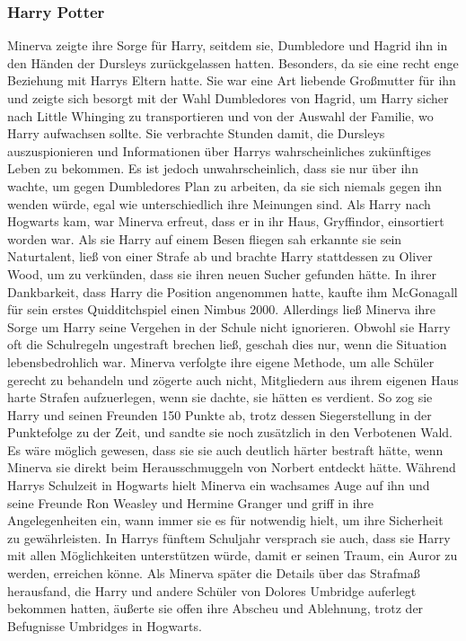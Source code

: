 \documentclass[a4paper, 10pt]{article}
\begin{document}
\subsubsection*{\large Harry Potter}
Minerva zeigte ihre Sorge für Harry, seitdem sie, Dumbledore und Hagrid ihn in den Händen der Dursleys zurückgelassen hatten. Besonders, da sie eine recht enge Beziehung mit Harrys Eltern hatte. Sie war eine Art liebende Großmutter für ihn und zeigte sich besorgt mit der Wahl Dumbledores von Hagrid, um Harry sicher nach Little Whinging zu transportieren und von der Auswahl der Familie, wo Harry aufwachsen sollte. Sie verbrachte Stunden damit, die Dursleys auszuspionieren und Informationen über Harrys wahrscheinliches zukünftiges Leben zu bekommen. Es ist jedoch unwahrscheinlich, dass sie nur über ihn wachte, um gegen Dumbledores Plan zu arbeiten, da sie sich niemals gegen ihn wenden würde, egal wie unterschiedlich ihre Meinungen sind.
\vspace{10pt}
\newline
Als Harry nach Hogwarts kam, war Minerva erfreut, dass er in ihr Haus, Gryffindor, einsortiert worden war. Als sie Harry auf einem Besen fliegen sah erkannte sie sein Naturtalent, ließ von einer Strafe ab und brachte Harry stattdessen zu Oliver Wood, um zu verkünden, dass sie ihren neuen Sucher gefunden hätte. In ihrer Dankbarkeit, dass Harry die Position angenommen hatte, kaufte ihm McGonagall für sein erstes Quidditchspiel einen Nimbus 2000.
\vspace{10pt}
\newline
Allerdings ließ Minerva ihre Sorge um Harry seine Vergehen in der Schule nicht ignorieren. Obwohl sie Harry oft die Schulregeln ungestraft brechen ließ, geschah dies nur, wenn die Situation lebensbedrohlich war. Minerva verfolgte ihre eigene Methode, um alle Schüler gerecht zu behandeln und zögerte auch nicht, Mitgliedern aus ihrem eigenen Haus harte Strafen aufzuerlegen, wenn sie dachte, sie hätten es verdient. So zog sie Harry und seinen Freunden 150 Punkte ab, trotz dessen Siegerstellung in der Punktefolge zu der Zeit, und sandte sie noch zusätzlich in den Verbotenen Wald. Es wäre möglich gewesen, dass sie sie auch deutlich härter bestraft hätte, wenn Minerva sie direkt beim Herausschmuggeln von Norbert entdeckt hätte.
\vspace{10pt}
\newline
Während Harrys Schulzeit in Hogwarts hielt Minerva ein wachsames Auge auf ihn und seine Freunde Ron Weasley und Hermine Granger  und griff in ihre Angelegenheiten ein, wann immer sie es für notwendig hielt, um ihre Sicherheit zu gewährleisten. In Harrys fünftem Schuljahr versprach sie auch, dass sie Harry mit allen Möglichkeiten unterstützen würde, damit er seinen Traum, ein Auror zu werden, erreichen könne. Als Minerva später die Details über das Strafmaß herausfand, die Harry und andere Schüler von Dolores Umbridge auferlegt bekommen hatten, äußerte sie offen ihre Abscheu und Ablehnung, trotz der Befugnisse Umbridges in Hogwarts.
\end{document}
